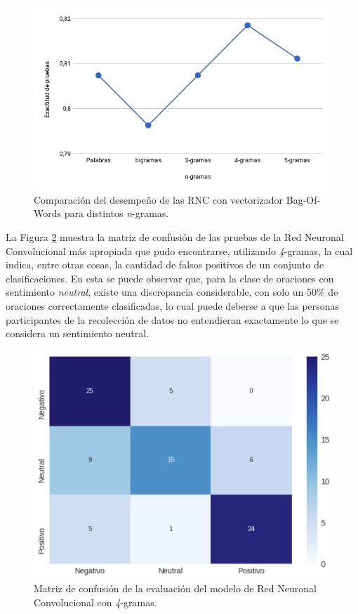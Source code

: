 \documentclass[conference]{IEEEtran}
\begin{document}
        \begin{figure}[htbp]
            \centerline{\includegraphics[width=\linewidth]{figuras/acc_rnc_ngrams.png}}
            \caption{Comparación del desempeño de las RNC con vectorizador Bag-Of-Words para distintos \textit{n}-gramas.}
            \label{fig:acc_rnc_ngrams}
        \end{figure}
    
        La Figura \ref{fig:matriz_confusion} muestra la matriz de confusión de las pruebas de la Red Neuronal Convolucional más apropiada que pudo encontrarse, utilizando \textit{4}-gramas, la cual indica, entre otras cosas, la cantidad de falsos positivos de un conjunto de clasificaciones. En esta se puede observar que, para la clase de oraciones con sentimiento \textit{neutral}, existe una discrepancia considerable, con solo un 50\% de oraciones correctamente clasificadas, lo cual puede deberse a que las personas participantes de la recolección de datos no entendieran exactamente lo que se considera un sentimiento neutral.
    
        \begin{figure}[htbp]
            \centerline{\includegraphics[width=\linewidth]{figuras/matriz_confusion.png}}
            \caption{Matriz de confusión de la evaluación del modelo de Red Neuronal Convolucional con \textit{4}-gramas.}
            \label{fig:matriz_confusion}
        \end{figure}
    
\end{document}
